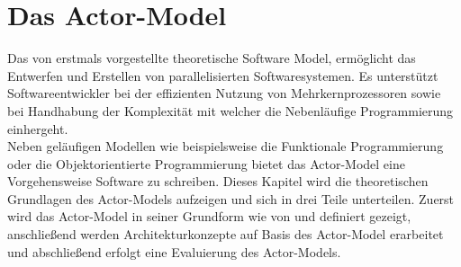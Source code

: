 \chapter{Das Actor-Model} \label{actor:chapter}
Das von \cite{hewitt1973session} erstmals vorgestellte theoretische Software Model, ermöglicht das Entwerfen und Erstellen von parallelisierten Softwaresystemen. Es unterstützt Softwareentwickler bei der effizienten Nutzung von Mehrkernprozessoren sowie bei Handhabung der  Komplexität mit welcher die Nebenläufige Programmierung einhergeht.   
\\
Neben geläufigen Modellen wie beispielsweise die Funktionale Programmierung oder die Objektorientierte Programmierung bietet das Actor-Model eine Vorgehensweise Software zu schreiben. Dieses Kapitel wird die theoretischen Grundlagen des Actor-Models aufzeigen und sich in drei Teile unterteilen. Zuerst wird das Actor-Model in seiner Grundform wie von \cite{hewitt1973session} und \cite{Agha1985ActorsSystems} definiert gezeigt, anschließend werden Architekturkonzepte auf Basis des Actor-Model erarbeitet und abschließend erfolgt eine Evaluierung des Actor-Models.




